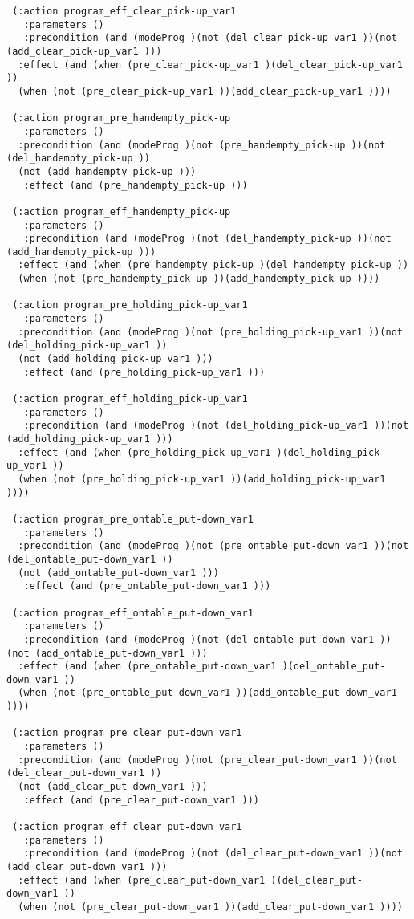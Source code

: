 \begin{scriptsize}
\begin{verbatim}
 (:action program_eff_clear_pick-up_var1
   :parameters ()
   :precondition (and (modeProg )(not (del_clear_pick-up_var1 ))(not (add_clear_pick-up_var1 )))
  :effect (and (when (pre_clear_pick-up_var1 )(del_clear_pick-up_var1 ))
  (when (not (pre_clear_pick-up_var1 ))(add_clear_pick-up_var1 ))))

 (:action program_pre_handempty_pick-up
   :parameters ()
  :precondition (and (modeProg )(not (pre_handempty_pick-up ))(not (del_handempty_pick-up ))
  (not (add_handempty_pick-up )))
   :effect (and (pre_handempty_pick-up )))

 (:action program_eff_handempty_pick-up
   :parameters ()
   :precondition (and (modeProg )(not (del_handempty_pick-up ))(not (add_handempty_pick-up )))
  :effect (and (when (pre_handempty_pick-up )(del_handempty_pick-up ))
  (when (not (pre_handempty_pick-up ))(add_handempty_pick-up ))))

 (:action program_pre_holding_pick-up_var1
   :parameters ()
  :precondition (and (modeProg )(not (pre_holding_pick-up_var1 ))(not (del_holding_pick-up_var1 ))
  (not (add_holding_pick-up_var1 )))
   :effect (and (pre_holding_pick-up_var1 )))

 (:action program_eff_holding_pick-up_var1
   :parameters ()
   :precondition (and (modeProg )(not (del_holding_pick-up_var1 ))(not (add_holding_pick-up_var1 )))
  :effect (and (when (pre_holding_pick-up_var1 )(del_holding_pick-up_var1 ))
  (when (not (pre_holding_pick-up_var1 ))(add_holding_pick-up_var1 ))))

 (:action program_pre_ontable_put-down_var1
   :parameters ()
  :precondition (and (modeProg )(not (pre_ontable_put-down_var1 ))(not (del_ontable_put-down_var1 ))
  (not (add_ontable_put-down_var1 )))
   :effect (and (pre_ontable_put-down_var1 )))

 (:action program_eff_ontable_put-down_var1
   :parameters ()
   :precondition (and (modeProg )(not (del_ontable_put-down_var1 ))(not (add_ontable_put-down_var1 )))
  :effect (and (when (pre_ontable_put-down_var1 )(del_ontable_put-down_var1 ))
  (when (not (pre_ontable_put-down_var1 ))(add_ontable_put-down_var1 ))))

 (:action program_pre_clear_put-down_var1
   :parameters ()
  :precondition (and (modeProg )(not (pre_clear_put-down_var1 ))(not (del_clear_put-down_var1 ))
  (not (add_clear_put-down_var1 )))
   :effect (and (pre_clear_put-down_var1 )))

 (:action program_eff_clear_put-down_var1
   :parameters ()
   :precondition (and (modeProg )(not (del_clear_put-down_var1 ))(not (add_clear_put-down_var1 )))
  :effect (and (when (pre_clear_put-down_var1 )(del_clear_put-down_var1 ))
  (when (not (pre_clear_put-down_var1 ))(add_clear_put-down_var1 ))))


\end{verbatim}
\end{scriptsize}
